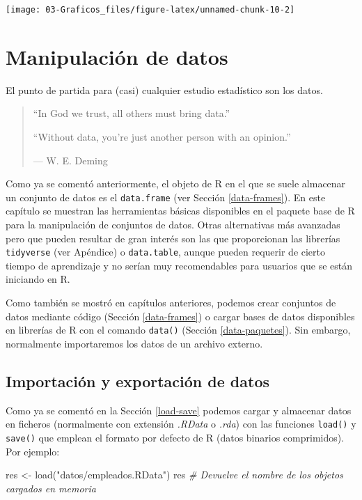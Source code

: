 \documentclass[
]{book}
\newenvironment{Shaded}{\begin{snugshade}}{\end{snugshade}}
\newcommand{\CommentTok}[1]{\textcolor[rgb]{0.56,0.35,0.01}{\textit{#1}}}
\newcommand{\FunctionTok}[1]{\textcolor[rgb]{0.00,0.00,0.00}{#1}}
\newcommand{\NormalTok}[1]{#1}
\newcommand{\OtherTok}[1]{\textcolor[rgb]{0.56,0.35,0.01}{#1}}
\newcommand{\StringTok}[1]{\textcolor[rgb]{0.31,0.60,0.02}{#1}}
\theoremstyle{break}
\theoremstyle{nonumberplain}
\begin{document}
\begin{center}\texttt{[image: 03-Graficos\_files/figure-latex/unnamed-chunk-10-2]} \end{center}

\hypertarget{manipulacion}{%
\chapter{Manipulación de datos}\label{manipulacion}}

El punto de partida para (casi) cualquier estudio estadístico son los datos.

\begin{quote}
``In God we trust, all others must bring data.''

``Without data, you're just another person with an opinion.''

--- W. E. Deming
\end{quote}

Como ya se comentó anteriormente, el objeto de R en el que se suele almacenar un conjunto de datos es el \texttt{data.frame} (ver Sección \ref{data-frames}).
En este capítulo se muestran las herramientas básicas disponibles en el paquete base de R para la manipulación de conjuntos de datos.
Otras alternativas más avanzadas pero que pueden resultar de gran interés son las que proporcionan las librerías \texttt{tidyverse} (ver Apéndice) o \texttt{data.table}, aunque pueden requerir de cierto tiempo de aprendizaje y no serían muy recomendables para usuarios que se están iniciando en R.

Como también se mostró en capítulos anteriores, podemos crear conjuntos de datos mediante código (Sección \ref{data-frames}) o cargar bases de datos disponibles en librerías de R con el comando \texttt{data()} (Sección \ref{data-paquetes}).
Sin embargo, normalmente importaremos los datos de un archivo externo.

\hypertarget{importar-exportar}{%
\section{Importación y exportación de datos}\label{importar-exportar}}

Como ya se comentó en la Sección \ref{load-save} podemos cargar y almacenar datos en ficheros (normalmente con extensión \emph{.RData} o \emph{.rda}) con las funciones \texttt{load()} y \texttt{save()} que emplean el formato por defecto de R (datos binarios comprimidos).
Por ejemplo:

\begin{Shaded}
\begin{Highlighting}[]
\NormalTok{res }\OtherTok{\textless{}{-}} \FunctionTok{load}\NormalTok{(}\StringTok{"datos/empleados.RData"}\NormalTok{)}
\NormalTok{res }\CommentTok{\# Devuelve el nombre de los objetos cargados en memoria}
\end{Highlighting}
\end{Shaded}
\end{document}
